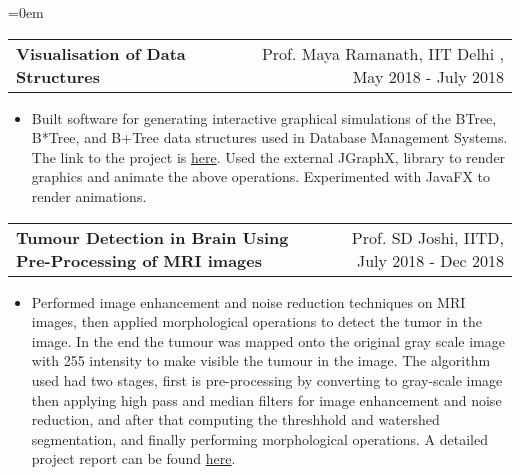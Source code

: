 \documentclass{article}
\makeatletter
\newenvironment{longversion}{}{} %
\newcommand{\headerrow}[2]
{\begin{tabular*}{\linewidth}{l@{\extracolsep{\fill}}r}
	#1 &
	#2 \\
\end{tabular*}}
\makeatother
\begin{document}
\begin{longversion}
\begin{list} {}{\leftmargin=0em}
 \item[]
\headerrow { \textbf{Visualisation of Data Structures}} {Prof. Maya Ramanath, IIT Delhi , May 2018 - July 2018}
 \begin{itemize} \item[]
Built software for generating interactive graphical simulations of the BTree, B*Tree, and B+Tree data structures used in Database Management Systems. The link to the project is \href{https://github.com/Yashpandey4/BTree_Vis}{here}. Used the external JGraphX,  library to render graphics and animate the above operations. Experimented with JavaFX to render animations.
 \end{itemize}

\item[]
\headerrow { \textbf{Tumour Detection in Brain Using Pre-Processing of MRI images}} {Prof. SD Joshi, IITD, July 2018 - Dec 2018}
 \begin{itemize} \item[]
Performed image enhancement and noise reduction
techniques on MRI images, then applied morphological operations to detect the tumor in the image. In the end the tumour was mapped onto
the original gray scale image with 255 intensity to make
visible the tumour in the image. The algorithm used had two stages, first is pre-processing by converting to gray-scale image then applying high pass and median filters for image enhancement and noise reduction, and after that computing the threshhold and watershed segmentation, and finally performing morphological operations. A detailed project report can be found  \href{https://drive.google.com/file/d/1SlMhfu_FqdmNmo-ZZoaVuqLGvVw4tHOT/view?usp=sharing}{here}.
 \end{itemize}
 
 

\end{list}
\end{longversion}
\end{document}
